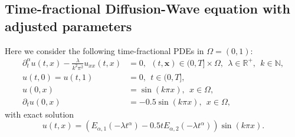 \documentclass[preprint,3p,times]{elsarticle}
\def\al{\alpha}
\def\x{\mathbf{x}}
\def\al{\alpha}
\def\dta{\partial_t^\alpha}
\begin{document}
\subsection{Time-fractional Diffusion-Wave equation with adjusted parameters}
\label{subsec:eg2}
Here we consider the following time-fractional PDEs in $\Omega=(0,1)$:
\begin{equation}
    \label{eqn:eg2}
    \begin{aligned}
        \dta u(t,x) - \frac{\lambda }{k^2\pi^2} u_{xx}(t,x) &= 0,~~ (t,\x)\in (0,T]\times\Omega, ~~\lambda\in\mathbb{R}^+,~~ k\in\mathbb{N}, \\
        u(t,0)=u(t,1)&=0,~~t\in(0,T],\\
        u(0,x)&=\sin(k\pi x), ~~x\in\Omega,\\
        \partial_tu(0,x)&=-0.5\sin(k\pi x), ~~x\in\Omega,
    \end{aligned}
\end{equation}
with  exact solution 
\begin{equation*}
    u(t,x)=  (E_{\al, 1}(-\lambda t^\al)-0.5tE_{\al,2}(-\lambda t^\al))\sin(k\pi x).
\end{equation*}
\end{document}
